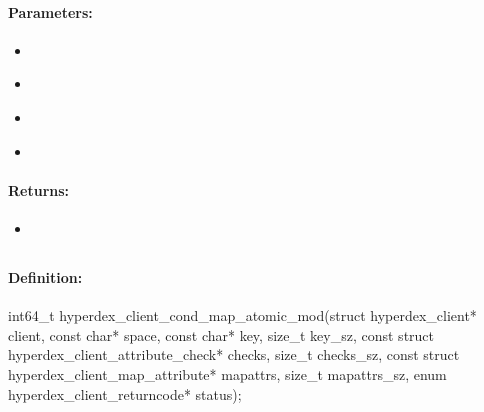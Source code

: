 \paragraph{Parameters:}
\begin{itemize}[noitemsep]
\item {}\\

\item {}\\

\item {}\\

\item {}\\

\end{itemize}

\paragraph{Returns:}
\begin{itemize}[noitemsep]
\item {}\\

\end{itemize}

\pagebreak
\subsection{}
\label{api:c:cond_map_atomic_mod}


\paragraph{Definition:}
\begin{ccode}
int64_t hyperdex_client_cond_map_atomic_mod(struct hyperdex_client* client,
        const char* space,
        const char* key, size_t key_sz,
        const struct hyperdex_client_attribute_check* checks, size_t checks_sz,
        const struct hyperdex_client_map_attribute* mapattrs, size_t mapattrs_sz,
        enum hyperdex_client_returncode* status);
\end{ccode}

